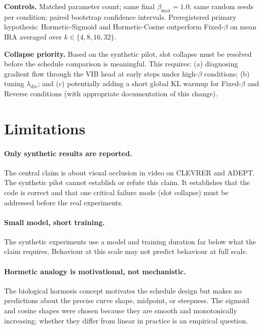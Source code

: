 \documentclass{article}
\begin{document}
\textbf{Controls.}
Matched parameter count; same final $\beta_\text{max}=1.0$;
same random seeds per condition; paired bootstrap confidence intervals.
Preregistered primary hypothesis: Hormetic-Sigmoid and Hormetic-Cosine
outperform Fixed-$\beta$ on mean IRA averaged over $k \in \{4, 8, 16, 32\}$.

\textbf{Collapse priority.}
Based on the synthetic pilot, slot collapse must be resolved before the schedule
comparison is meaningful.
This requires: (a) diagnosing gradient flow through the VIB head at early steps
under high-$\beta$ conditions; (b) tuning $\lambda_\text{div}$; and
(c) potentially adding a short global KL warmup for Fixed-$\beta$ and Reverse
conditions (with appropriate documentation of this change).


\section{Limitations}

\paragraph{Only synthetic results are reported.}
The central claim is about visual occlusion in video on CLEVRER and ADEPT.
The synthetic pilot cannot establish or refute this claim.
It establishes that the code is correct and that one critical failure mode
(slot collapse) must be addressed before the real experiments.

\paragraph{Small model, short training.}
The synthetic experiments use a model and training duration far below what the
claim requires. Behaviour at this scale may not predict behaviour at full scale.

\paragraph{Hormetic analogy is motivational, not mechanistic.}
The biological hormesis concept motivates the schedule design but makes no
predictions about the precise curve shape, midpoint, or steepness.
The sigmoid and cosine shapes were chosen because they are smooth and
monotonically increasing; whether they differ from linear in practice is an
empirical question.
\end{document}
